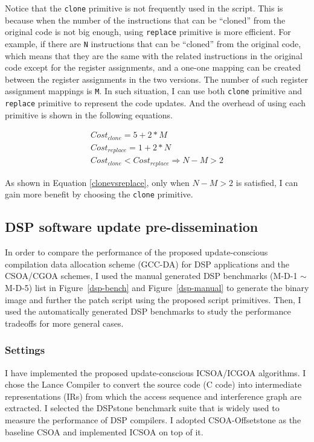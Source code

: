 Notice that the {\tt clone} primitive is not frequently used in the script. This is because when the number of the instructions that can be ``cloned'' from the original code is not big enough, using {\tt replace} primitive is more efficient. For example, if there are {\tt N} instructions that can be ``cloned'' from the original code, which means that they are the same with the related instructions in the original code except for the register assignments, and a one-one mapping can be created between the register assignments in the two versions. The number of such register assignment mappings is {\tt M}. 
In such situation, I can use both {\tt clone} primitive and {\tt replace} primitive to represent the code updates. And the overhead of using each primitive is shown in the following equations.

\begin{small}
\begin{eqnarray}
Cost_{clone} = 5 + 2*M\\
Cost_{replace} = 1 + 2*N\\
Cost_{clone} < Cost_{replace} \Rightarrow N-M > 2
\label{clonevsreplace}
\end{eqnarray}
\end{small}

As shown in Equation \ref{clonevsreplace}, only when $N-M > 2$ is satisfied, I can gain more benefit by choosing the {\tt clone} primitive.

\subsection{DSP software update pre-dissemination}

In order to compare the performance of the proposed update-conscious compilation data
allocation scheme (GCC-DA) for DSP applications and the CSOA/CGOA schemes, I used the manual generated DSP
benchmarks (M-D-1 $\sim$ M-D-5)
list in Figure~\ref{dsp-bench} and Figure~\ref{dsp-manual} to generate the binary image
and further the patch script using the proposed script primitives.
Then, I used the automatically generated DSP benchmarks to study the performance tradeoffs
for more general cases.

\subsubsection{Settings}
I have implemented the proposed update-conscious ICSOA/ICGOA algorithms. I chose the Lance Compiler\cite{lance} to convert the source code (C code) into intermediate representations (IRs) from which the access sequence and interference graph are extracted. I selected the DSPstone\cite{dspstone} benchmark suite that is widely used to measure the performance of DSP compilers. I adopted CSOA-Offsetstone\cite{offsetstone} as the baseline CSOA and implemented ICSOA on top of it. 
%


